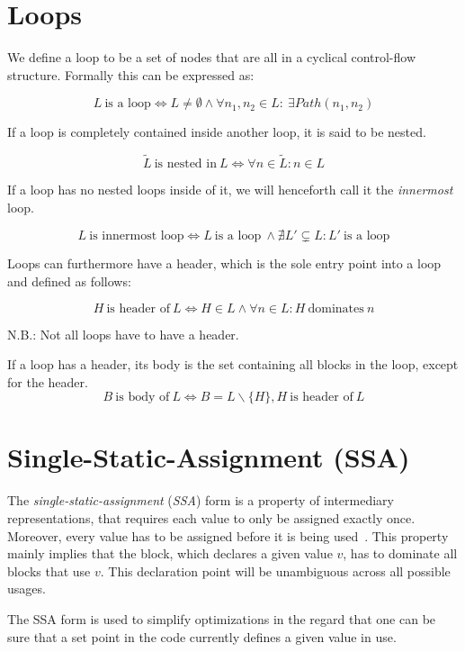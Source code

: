 
\section{Loops}\label{sec:basics:loops}

We define a loop to be a set of nodes that are all in a cyclical control-flow structure.
Formally this can be expressed as:

$$L~\text{is a loop} \Longleftrightarrow L \neq \emptyset \wedge \forall n_1, n_2 \in L:~\exists Path(n_1, n_2)$$

If a loop is completely contained inside another loop, it is said to be nested.

$$\tilde{L}~\text{is nested in}~L \Longleftrightarrow \forall n \in \tilde{L}: n \in L$$

If a loop has no nested loops inside of it, we will henceforth call it the \textit{innermost} loop.

$$L~\text{is innermost loop} \Longleftrightarrow L~\text{is a loop}~\wedge \nexists L' \subsetneq L: L'~\text{is a loop}$$

Loops can furthermore have a header, which is the sole entry point into a loop~\cite{aebi18bachelorarbeit} and defined as follows:

$$H~\text{is header of}~L \Longleftrightarrow H \in L \wedge \forall n \in L: H~\text{dominates}~n$$

N.B.: Not all loops have to have a header.

If a loop has a header, its body is the set containing all blocks in the loop, except for the header.
$$B~\text{is body of}~L \Longleftrightarrow B = L \backslash \{H\}, H~\text{is header of}~L$$

\section{Single-Static-Assignment (SSA)}\label{sec:basics:ssa}

The \textit{single-static-assignment} (\textit{SSA}) form is a property of intermediary representations, that requires each value to only be assigned exactly once.
Moreover, every value has to be assigned before it is being used~\cite{cytron91}.
This property mainly implies that the block, which declares a given value $v$, has to dominate all blocks that use $v$.
This declaration point will be unambiguous across all possible usages.

The SSA form is used to simplify optimizations in the regard that one can be sure that a set point in the code currently defines a given value in use.

